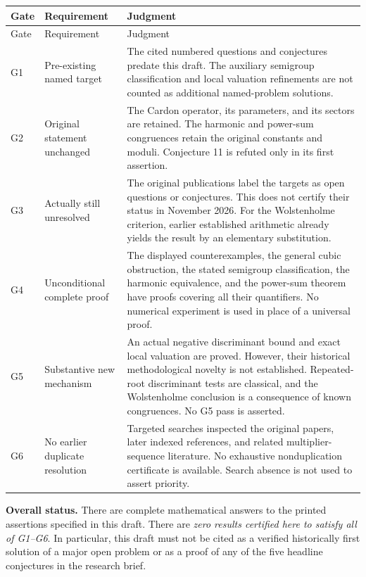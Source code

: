 \documentclass[11pt,a4paper]{article}
\theoremstyle{definition}
\theoremstyle{remark}
\begin{document}
\begin{longtable}{@{}L{0.09\textwidth}L{0.24\textwidth}L{0.61\textwidth}@{}}
\toprule
Gate & Requirement & Judgment\\
\midrule
\endfirsthead
\toprule Gate & Requirement & Judgment\\\midrule
\endhead
G1 & Pre-existing named target & The cited numbered questions and
conjectures predate this draft.  The auxiliary semigroup
classification and local valuation refinements are not counted as
additional named-problem solutions.\\[5pt]
G2 & Original statement unchanged & The Cardon operator, its
parameters, and its sectors are retained.  The harmonic and
power-sum congruences retain the original constants and moduli.
Conjecture 11 is refuted only in its first assertion.\\[5pt]
G3 & Actually still unresolved & The original publications label
the targets as open questions or conjectures.  This does not certify
their status in November 2026.  For the Wolstenholme criterion,
earlier established arithmetic already yields the result by an
elementary substitution.\\[5pt]
G4 & Unconditional complete proof & The displayed counterexamples,
the general cubic obstruction, the stated semigroup classification,
the harmonic equivalence, and the power-sum theorem have proofs
covering all their quantifiers.  No numerical experiment is used
in place of a universal proof.\\[5pt]
G5 & Substantive new mechanism & An actual negative discriminant
bound and exact local valuation are proved.  However, their
historical methodological novelty is not established.  Repeated-root
discriminant tests are classical, and the Wolstenholme conclusion is
a consequence of known congruences.  No G5 pass is asserted.\\[5pt]
G6 & No earlier duplicate resolution & Targeted searches inspected
the original papers, later indexed references, and related
multiplier-sequence literature.  No exhaustive nonduplication
certificate is available.  Search absence is not used to assert
priority.\\
\bottomrule
\end{longtable}

\noindent\textbf{Overall status.}
There are complete mathematical answers to the printed assertions
specified in this draft.  There are \emph{zero results certified here
to satisfy all of G1--G6}.  In particular, this draft must not be
cited as a verified historically first solution of a major open
problem or as a proof of any of the five headline conjectures in
the research brief.
\end{document}
